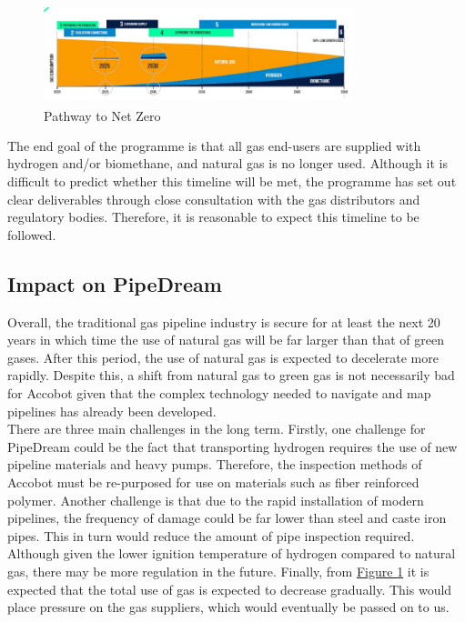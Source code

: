 \documentclass[11pt]{article}		%
\newcommand{\supercite}[1]{\textsuperscript{\cite{#1}}}		%
\newcommand{\figref}[1]{\hyperref[#1]{Figure \ref*{#1}}}    %
\begin{document}
    		\begin{figure}[h]
    			\centering
    			\includegraphics[width = 0.8\textwidth]{futureforecaset.jpg}
    			\caption{Pathway to Net Zero \supercite{gasgoesgreen} }	
    			\label{forecast}
    		\end{figure}
    		
    		The end goal of the programme is that all gas end-users are supplied with hydrogen and/or biomethane, and natural gas is no longer used. Although it is difficult to predict whether this timeline will be met, the programme has set out clear deliverables through close consultation with the gas distributors and regulatory bodies. Therefore, it is reasonable to expect this timeline to be followed. 
    
    		
    		\subsection[Impact on PipeDream]{Impact on PipeDream}
    		Overall, the traditional gas pipeline industry is secure for at least the next 20 years in which time the use of natural gas will be far larger than that of green gases. After this period, the use of natural gas is expected to decelerate more rapidly. Despite this, a shift from natural gas to green gas is not necessarily bad for Accobot given that the complex technology needed to navigate and map pipelines has already been developed. \\
    	    \hspace*{3ex}There are three main challenges in the long term. Firstly, one challenge for PipeDream could be the fact that transporting hydrogen requires the use of new pipeline materials and heavy pumps. Therefore, the inspection methods of Accobot must be re-purposed for use on materials such as fiber reinforced polymer. Another challenge is that due to the rapid installation of modern pipelines, the frequency of damage could be far lower than steel and caste iron pipes. This in turn would reduce the amount of pipe inspection required. Although given the lower ignition temperature of hydrogen compared to natural gas, there may be more regulation in the future. Finally, from \figref{forecast} it is expected that the total use of gas is expected to decrease gradually. This would place pressure on the gas suppliers, which would eventually be passed on to us. 
\end{document}

